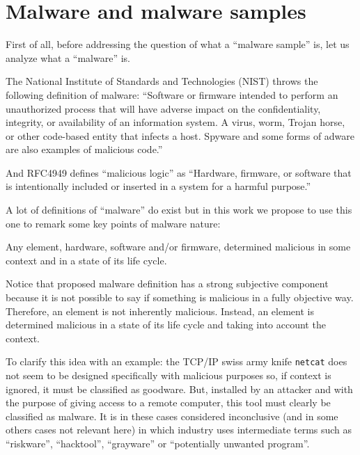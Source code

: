 \chapter{Malware and malware samples}

First of all, before addressing the question of what a ``malware sample'' is,
let us analyze what a ``malware'' is.

The National Institute of Standards and Technologies (NIST) throws the
following definition of malware: ``Software or firmware intended to perform an
unauthorized process that will have adverse impact on the confidentiality,
integrity, or availability of an information system. A virus, worm, Trojan
horse, or other code-based entity that infects a host. Spyware and some forms
of adware are also examples of malicious
code.''\cite{Nist2013}

And RFC4949\cite{Rfc4949} defines
``malicious logic'' as ``Hardware, firmware, or software that is intentionally
included or inserted in a system for a harmful purpose.''

A lot of definitions of ``malware'' do
exist\cite{NistGlossary2020} but in this work we propose to use this one to remark some key points of
malware nature:
\begin{tcolorbox}
  Any element, hardware, software and/or firmware, determined malicious in
  some context and in a state of its life cycle.
\end{tcolorbox}

Notice that proposed malware definition has a strong subjective component
because it is not possible to say if something is malicious in a fully
objective way\cite{LayeredDetectionMethod}.  Therefore, an element is not inherently malicious. Instead, an
element is determined malicious in a state of its life cycle and taking into
account the context.

To clarify this idea with an example: the TCP/IP swiss army knife
\texttt{netcat} does not seem to be designed specifically with malicious
purposes so, if context is ignored, it must be classified as goodware. But,
installed by an attacker and with the purpose of giving access to a remote
computer, this tool must clearly be classified as malware. It is in these
cases considered inconclusive (and in some others cases not relevant here) in
which industry uses intermediate terms such as ``riskware'', ``hacktool'',
``grayware'' or ``potentially unwanted program''.

